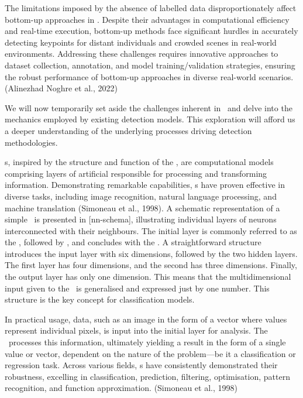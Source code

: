 The limitations imposed by the absence of labelled data disproportionately affect bottom-up approaches in \HPE. Despite their advantages in computational efficiency and real-time execution, bottom-up methods face significant hurdles in accurately detecting keypoints for distant individuals and crowded scenes in real-world environments. Addressing these challenges requires innovative approaches to dataset collection, annotation, and model training/validation strat\-egies, ensuring the robust performance of bottom-up approaches in diverse real-world scenarios. (\scc Alinezhad Noghre et al., 2022)

We will now temporarily set aside the challenges inherent in \HPE\ and delve into the mechanics employed by existing detection models. This exploration will afford us a deeper understanding of the underlying processes driving detection methodologies.

\NN\-s, inspired by the structure and function of the , are computational models comprising  layers of artificial  respon\-sible for processing and transforming information. Demonstrating remarkable capabilities, \NN\-s have proven effective in diverse tasks, including image recognition, natural language processing, and machine translation (\scc Simoneau et al., 1998). A schematic representation of a simple \NN\ is presented in [nn-schema], illustrating individual layers of neurons interconnected with their neighbours. The initial layer is commonly referred to as the , followed by , and concludes with the . A straightforward structure introduces the input layer with six dimensions, followed by the two hidden layers. The first layer has four dimensions, and the second has three dimensions. Finally, the output layer has only one dimension. This means that the multidimensional input given to the \NN\ is generalised and expressed just by one number. This structure is the key concept for classification models.

In practical usage, data, such as an image in the form of a vector where values represent individual pixels, is input into the initial layer for analysis. The \NN\ processes this information, ultimately yielding a result in the form of a single value or vector, dependent on the nature of the problem—be it a classification or regression task. Across various fields, \NN\-s have consistently demonstrated their robustness, excelling in classification, prediction, filtering, optimisation, pattern recognition, and function approximation. (\scc Simoneau et al., 1998)

